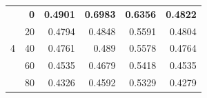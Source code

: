 \documentclass[a4paper]{llncs}
\begin{document}
\begin{table}[htbp!]
{\begin{tabular}{crrrrr}
\multirow{5}{*}{4} & \textbf{0}  & \textbf{0.4901} & \textbf{0.6983} & \textbf{0.6356} & \textbf{0.4822} \\
                   & 20          & 0.4794          & 0.4848          & 0.5591          & 0.4804          \\
                   & 40          & 0.4761          & 0.489           & 0.5578          & 0.4764          \\
                   & 60          & 0.4535          & 0.4679          & 0.5418          & 0.4535          \\
                   & 80          & 0.4326          & 0.4592          & 0.5329          & 0.4279          \\ \hline
\end{tabular}%
}
\end{table}
\end{document}
